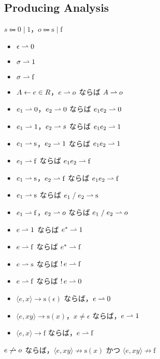 \subsection{Producing Analysis}

$s \Coloneq 0 \mid 1$，$o \Coloneq \mathrm{s} \mid \mathrm{f}$

\begin{itemize}
  \item $\epsilon \rightharpoonup 0$
  \item $\sigma \rightharpoonup 1$
  \item $\sigma \rightharpoonup \mathrm{f}$
  \item $A \gets e \in R$，$e \rightharpoonup o$ ならば $A \rightharpoonup o$
  \item $e_1 \rightharpoonup 0$，$e_2 \rightharpoonup 0$ ならば $e_1e_2 \rightharpoonup 0$
  \item $e_1 \rightharpoonup 1$，$e_2 \rightharpoonup s$ ならば $e_1e_2 \rightharpoonup 1$
  \item $e_1 \rightharpoonup \mathrm{s}$，$e_2 \rightharpoonup 1$ ならば $e_1e_2 \rightharpoonup 1$
  \item $e_1 \rightharpoonup \mathrm{f}$ ならば $e_1e_2 \rightharpoonup \mathrm{f}$
  \item $e_1 \rightharpoonup \mathrm{s}$，$e_2 \rightharpoonup \mathrm{f}$ ならば $e_1e_2 \rightharpoonup \mathrm{f}$
  \item $e_1 \rightharpoonup \mathrm{s}$ ならば $e_1 \mathrel{/} e_2 \rightharpoonup \mathrm{s}$
  \item $e_1 \rightharpoonup \mathrm{f}$，$e_2 \rightharpoonup o$ ならば $e_1 \mathrel{/} e_2 \rightharpoonup o$
  \item $e \rightharpoonup 1$ ならば $e^* \rightharpoonup 1$
  \item $e \rightharpoonup \mathrm{f}$ ならば $e^* \rightharpoonup \mathrm{f}$
  \item $e \rightharpoonup \mathrm{s}$ ならば $\mathop{!} e \rightharpoonup \mathrm{f}$
  \item $e \rightharpoonup \mathrm{f}$ ならば $\mathop{!} e \rightharpoonup 0$
\end{itemize}

\begin{theorem}
  \hwordspace{}
  \begin{itemize}
    \item $\langle e, x\rangle \to \mathrm{s}(\epsilon)$ ならば，$e \rightharpoonup 0$
    \item $\langle e, xy\rangle \to \mathrm{s}(x)$，$x \neq \epsilon$ ならば，$e \rightharpoonup 1$
    \item $\langle e, x\rangle \to \mathrm{f}$ ならば，$e \rightharpoonup \mathrm{f}$
  \end{itemize}
\end{theorem}

\begin{corollary}
  $e \not\rightharpoonup o$ ならば，$\langle e, xy\rangle \not\to \mathrm{s}(x)$ かつ $\langle e, xy\rangle \not\to \mathrm{f}$
\end{corollary}
